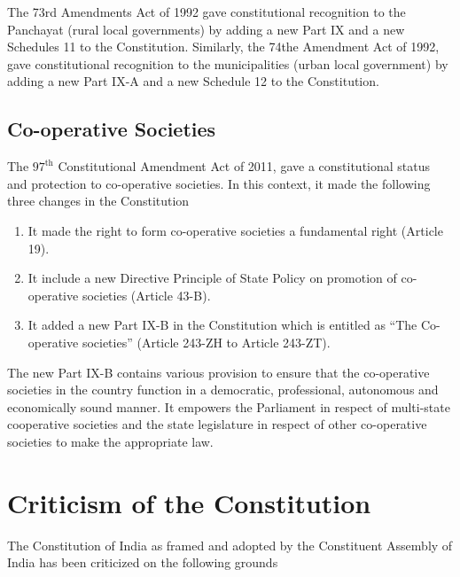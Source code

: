 The 73rd Amendments Act of 1992 gave constitutional recognition to the Panchayat (rural local governments) by adding a new Part IX and a new Schedules 11 to the Constitution. Similarly, the 74the Amendment Act of 1992, gave constitutional recognition to the municipalities (urban local government) by adding a new Part IX-A and a new Schedule 12 to the Constitution.

\subsection{Co-operative Societies}

The $97^{\text{th}}$ Constitutional Amendment Act of 2011, gave a constitutional status and protection to co-operative societies. In this context, it made the following three changes in the Constitution

\begin{enumerate}
  \item It made the right to form co-operative societies a fundamental right (Article 19).
  \item It include a new Directive Principle of State Policy on promotion of co-operative societies (Article 43-B).
  \item It added a new Part IX-B in the Constitution which is entitled as ``The Co-operative societies'' (Article 243-ZH to Article 243-ZT).
\end{enumerate}

The new Part IX-B contains various provision to ensure that the co-operative societies in the country function in a democratic, professional, autonomous and economically sound manner. It empowers the Parliament in respect of multi-state cooperative societies and the state legislature in respect of other co-operative societies to make the appropriate law.

\section{Criticism of the Constitution}

The Constitution of India as framed and adopted by the Constituent Assembly of India has been criticized on the following grounds

